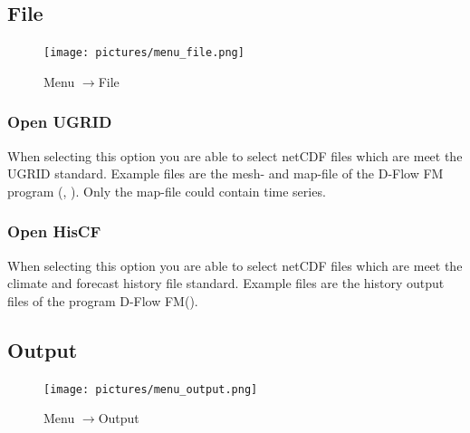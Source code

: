 \documentclass{deltares_memo}
\newcommand{\menuarrow}{$\rightarrow$}
\newcommand{\dflowfm}{D-Flow FM\xspace}
\newcommand{\netcdf}{netCDF\xspace}
\begin{document}
\subsection{File}
\phantom{m}\vspace{-\baselineskip}
\begin{figure}[H]
    \centering    
    \texttt{[image: pictures/menu\_file.png]}
    \caption{Menu \menuarrow File}
\end{figure}

\subsubsection{Open UGRID}
When selecting this option you are able to select \netcdf files which are meet the UGRID standard. 
Example files are the mesh- and map-file of the \dflowfm program (, ).
Only the map-file could contain time series.
\subsubsection{Open HisCF}
When selecting this option you are able to select \netcdf files which are meet the climate and forecast history file standard.
Example files are the history output files of the program \dflowfm ().
\subsection{Output}
\phantom{m}\vspace{-\baselineskip}
\begin{figure}[H]
    \centering    
    \texttt{[image: pictures/menu\_output.png]}
    \caption{Menu \menuarrow Output}
\end{figure}

\end{document}
